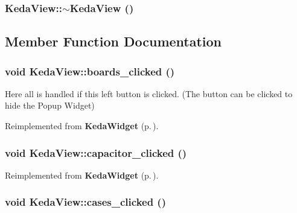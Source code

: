 \subsubsection{\setlength{\rightskip}{0pt plus 5cm}Keda\-View::$\sim$Keda\-View ()\hspace{0.3cm}{\tt  [virtual]}}\label{classKedaView_8b166451d051501d47ad7a73709d784c}




\subsection{Member Function Documentation}
\subsubsection{\setlength{\rightskip}{0pt plus 5cm}void Keda\-View::boards\_\-clicked ()\hspace{0.3cm}{\tt  [virtual, slot]}}\label{classKedaView_1c2bd79a14355c76b2234b50471542e1}


Here all is handled if this left button is clicked. (The button can be clicked to hide the Popup Widget) 

Reimplemented from {\bf Keda\-Widget} {\rm (p.\,\pageref{classKedaWidget_1c2bd79a14355c76b2234b50471542e1})}.
\subsubsection{\setlength{\rightskip}{0pt plus 5cm}void Keda\-View::capacitor\_\-clicked ()\hspace{0.3cm}{\tt  [virtual, slot]}}\label{classKedaView_4cf2ce911169acb0f4c64903c59102d2}




Reimplemented from {\bf Keda\-Widget} {\rm (p.\,\pageref{classKedaWidget_4cf2ce911169acb0f4c64903c59102d2})}.
\subsubsection{\setlength{\rightskip}{0pt plus 5cm}void Keda\-View::cases\_\-clicked ()\hspace{0.3cm}{\tt  [virtual, slot]}}\label{classKedaView_0bfe24ffa85bfd7bedf9571854644846}




